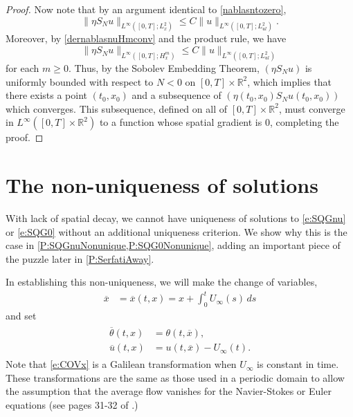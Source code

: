 \documentclass[11pt,reqno,xcolor=svgnames]{amsart}
\def\R{{\mathbb R}}
\theoremstyle{plain}
\theoremstyle{definition}
\theoremstyle{plain}
\theoremstyle{remark}
\newcommand{\iny}{\ensuremath{\infty}}
\newcommand{\ol}{\overline}
\newcommand{\ox}{{\ol{x}}}
\newcommand{\otheta}{\ol{\theta}}
\begin{document}
\begin{proof}
Now note that by an argument identical to \cref{nablasntozero},
$$\|\eta  S_Nu  \|_{L^{\infty}([0,T]; L^2_x)} \leq C\|u \|_{L^{\infty}([0,T];L^2_{ul})}.$$  Moreover, by \cref{dernablasnuHmconv} and the product rule, we have 
\begin{equation}\label{etasnuisbounded}
\|\eta  S_Nu  \|_{L^{\infty}([0,T]; H^m_x)} \leq C\|u \|_{L^{\infty}([0,T];L^2_{ul})}
\end{equation}
for each $m\geq 0$.  Thus, by the Sobolev Embedding Theorem, $(\eta  S_Nu)$ is uniformly bounded with respect to $N<0$ on $[0,T]\times \R^2$, which implies that there exists a point $(t_0,x_0)$ and a subsequence of $(\eta(t_0,x_0)S_Nu(t_0,x_0))$ which converges.  This subsequence, defined on all of $[0,T]\times\R^2$, must converge in $L^{\infty}([0,T]\times \R^2)$ to a function whose spatial gradient is $0$, completing the proof. 
\end{proof}











\section{The non-uniqueness of solutions}\label{S:NonUniquess}

\noindent With lack of spatial decay, we cannot have uniqueness of solutions to \cref{e:SQGnu} or \cref{e:SQG0} without an additional uniqueness criterion. We show why this is the case in \cref{P:SQGnuNonunique,P:SQG0Nonunique}, adding an important piece of the puzzle later in \cref{P:SerfatiAway}.

In establishing this non-uniqueness, we will make the change of variables,
\begin{align}\label{e:COVx}
	\ox &= \ox(t, x) = x + \int_0^t U_\iny(s) \, ds
\end{align}
and set
\begin{align}\label{e:SolTranslation}
	\begin{split}
	\otheta(t, x)
		&= \theta(t, \ox), \\
	\ol{u}(t, x)
		&= u(t, \ox) - U_\iny(t).
	\end{split}
\end{align}
Note that \cref{e:COVx} is a Galilean transformation when $U_\iny$ is constant in time. These transformations are the same as those used in a periodic domain to allow the assumption that the average flow vanishes for the Navier-Stokes or Euler equations (see pages 31-32 of \cite{FMRT}.) 
 
\end{document}
